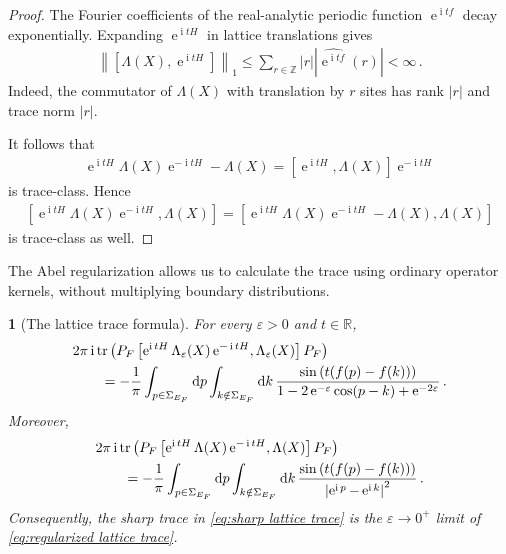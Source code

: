 \documentclass[a4paper,10pt]{article}
\numberwithin{equation}{section}
\theoremstyle{plain}
\theoremstyle{plain}
\newtheorem{lem}[thm]{\protect\lemmaname}
\theoremstyle{plain}
\theoremstyle{plain}
\theoremstyle{plain}
\theoremstyle{remark}
\theoremstyle{definition}
\theoremstyle{plain}
\providecommand{\lemmaname}{Lemma}
\newcommand{\ee}{\operatorname{e}}
\newcommand{\ii}{\operatorname{i}}
\newcommand{\ZZ}{\mathbb{Z}}
\newcommand{\RR}{\mathbb{R}}
\newcommand\norm[1]{\left\lVert#1\right\rVert}
\newcommand{\dif}{\operatorname{d}\!} %
\newcommand{\tr}{\operatorname{tr}}
\newcommand{\ve}{\varepsilon}
\newcommand{\eq}[1]{\begin{align*}#1\end{align*}}
\newcommand{\eql}[1]{\begin{align}#1\end{align}}
\begin{document}
\begin{proof}
The Fourier coefficients of the real-analytic periodic function
$\ee^{\ii tf}$ decay exponentially. Expanding $\ee^{\ii tH}$ in lattice
translations gives
\eq{\norm{\left[\Lambda(X),\ee^{\ii tH}\right]}_1
\leq
\sum_{r\in\ZZ}|r|
\left|\widehat{\ee^{\ii tf}}(r)\right|
<\infty\,.}
Indeed, the commutator of $\Lambda(X)$ with translation by $r$ sites has
rank $|r|$ and trace norm $|r|$.

It follows that
\eq{\ee^{\ii tH}\Lambda(X)\ee^{-\ii tH}-\Lambda(X)
=
\left[\ee^{\ii tH},\Lambda(X)\right]\ee^{-\ii tH}}
is trace-class. Hence
\eq{\left[
\ee^{\ii tH}\Lambda(X)\ee^{-\ii tH},\Lambda(X)
\right]
=
\left[
\ee^{\ii tH}\Lambda(X)\ee^{-\ii tH}-\Lambda(X),
\Lambda(X)
\right]}
is trace-class as well.
\end{proof}

The Abel regularization allows us to calculate the trace using ordinary
operator kernels, without multiplying boundary distributions.

\begin{lem}[The lattice trace formula]\label{lem:lattice trace formula}
For every $\ve>0$ and $t\in\RR$,
\eql{&2\pi\ii\tr\left(
P_F\left[
\ee^{\ii tH}\Lambda_\ve(X)\ee^{-\ii tH},
\Lambda_\ve(X)
\right]P_F
\right)\notag\\
&\qquad=
-\frac{1}{\pi}
\int_{p\in\Sigma_{E_F}}\dif{p}
\int_{k\notin\Sigma_{E_F}}\dif{k}\,
\frac{\sin\left(t(f(p)-f(k))\right)}
{1-2\ee^{-\ve}\cos(p-k)+\ee^{-2\ve}}\,.
\label{eq:regularized lattice trace}}
Moreover,
\eql{&2\pi\ii\tr\left(
P_F\left[
\ee^{\ii tH}\Lambda(X)\ee^{-\ii tH},
\Lambda(X)
\right]P_F
\right)\notag\\
&\qquad=
-\frac{1}{\pi}
\int_{p\in\Sigma_{E_F}}\dif{p}
\int_{k\notin\Sigma_{E_F}}\dif{k}\,
\frac{\sin\left(t(f(p)-f(k))\right)}
{\left|\ee^{\ii p}-\ee^{\ii k}\right|^2}\,.
\label{eq:sharp lattice trace}}
Consequently, the sharp trace in \cref{eq:sharp lattice trace} is the
$\ve\to0^+$ limit of \cref{eq:regularized lattice trace}.
\end{lem}
\end{document}
